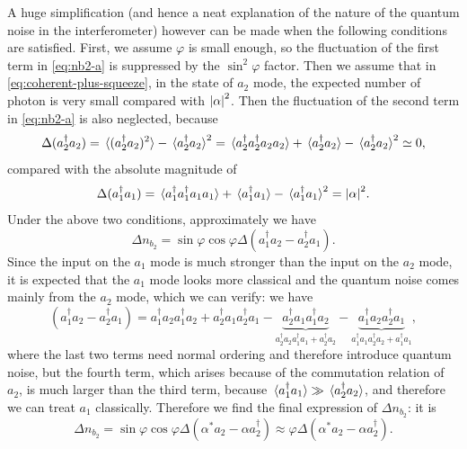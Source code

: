 \documentclass[hyperref, a4paper]{article}
\begin{document}
A huge simplification 
(and hence a neat explanation of the nature of the quantum noise in the interferometer) 
however can be made when the following conditions are satisfied.
First, we assume $\varphi$ is small enough, 
so the fluctuation of the first term in \eqref{eq:nb2-a} is suppressed by the $\sin^2 \varphi$ factor.
Then we assume that in \eqref{eq:coherent-plus-squeeze},
in the state of $a_2$ mode, the expected number of photon 
is very small compared with $\abs{\alpha}^2$.
Then the fluctuation of the second term in \eqref{eq:nb2-a} is also neglected,
because 
\begin{equation}
    \Delta (a_2^\dagger a_2) = \expval*{ (a_2^\dagger a_2)^2 } - \expval*{ a_2^\dagger a_2 }^2 = 
    \expval*{a_2^\dagger a_2^\dagger a_2 a_2} + \expval*{a_2^\dagger a_2} - \expval*{ a_2^\dagger a_2 }^2 \simeq 0,
\end{equation}
compared with the absolute magnitude of 
\begin{equation}
    \Delta (a_1^\dagger a_1) = 
    \expval*{a_1^\dagger a_1^\dagger a_1 a_1} + \expval*{a_1^\dagger a_1} - \expval*{ a_1^\dagger a_1 }^2 
    = \abs{\alpha}^2.
\end{equation}
Under the above two conditions, approximately we have 
\begin{equation}
    \Delta n_{b_2} = \sin \varphi \cos \varphi \Delta (a_1^\dagger a_2 - a_2^\dagger a_1 ) .
\end{equation}
Since the input on the $a_1$ mode is much stronger than the input on the $a_2$ mode,
it is expected that the $a_1$ mode looks more classical and 
the quantum noise comes mainly from the $a_2$ mode,
which we can verify:
we have 
\[
    (a_1^\dagger a_2 - a_2^\dagger a_1)
    = a_1^\dagger a_2 a_1^\dagger a_2
    + a_2^\dagger a_1 a_2^\dagger a_1
    - \underbrace{a_2^\dagger a_1 a_1^\dagger a_2}_{a_2^\dagger a_2 a_1^\dagger a_1 + a_2^\dagger a_2}
    - \underbrace{a_1^\dagger a_2 a_2^\dagger a_1}_{a_1^\dagger a_1 a_2^\dagger a_2 + a_1^\dagger a_1},
\]
where the last two terms need normal ordering and therefore introduce quantum noise,
but the fourth term, which arises because of the commutation relation of $a_2$, 
is much larger than the third term,
because $\expval*{a_1^\dagger a_1} \gg \expval*{a_2^\dagger a_2}$,
and therefore we can treat $a_1$ classically.
Therefore we find the final expression of $\Delta n_{b_2}$: 
it is 
\begin{equation}
    \Delta n_{b_2} = \sin \varphi \cos \varphi \Delta (\alpha^* a_2 - \alpha a_2^\dagger)
    \approx \varphi \Delta (\alpha^* a_2 - \alpha a_2^\dagger).
    \label{eq:nb2-single-mode}
\end{equation}
\end{document}

